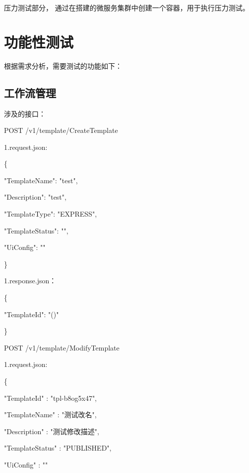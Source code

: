 压力测试部分， 通过在搭建的微服务集群中创建一个容器，用于执行压力测试\cite{zw4}。


\section{功能性测试}
根据需求分析，需要测试的功能如下：

\subsection{工作流管理}

涉及的接口：

POST /v1/template/CreateTemplate

1.request.json:

\{

"TemplateName": "test",

"Description": "test",

"TemplateType": "EXPRESS",


"TemplateStatus": "",

"UiConfig": ""

\}

1.response.json：

\{

"TemplateId": "\@exists()"

\}


POST /v1/template/ModifyTemplate

1.request.json:

\{

"TemplateId"          : "tpl-b8og5x47",

"TemplateName"        : "测试改名",

"Description"         : "测试修改描述",


"TemplateStatus"      : "PUBLISHED",

"UiConfig"            : ""

